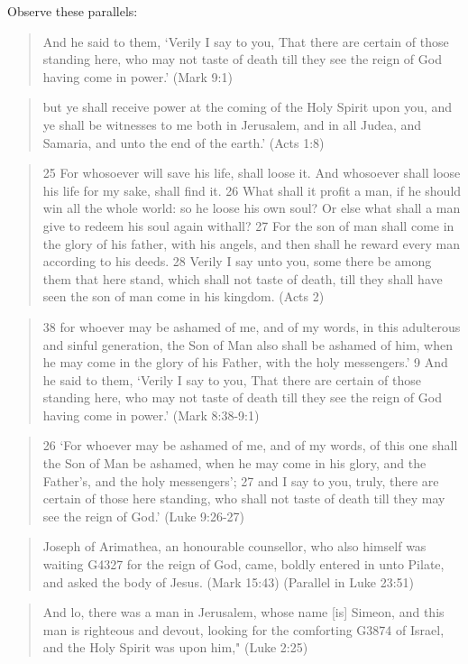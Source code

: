\documentclass[11pt]{article}
\begin{document}
Observe these parallels:
\begin{quote}
And he said to them, ‘Verily I say to you, That there are certain of those standing here, who may not taste of death till they see the reign of God having come in power.’ (Mark 9:1)
\end{quote}
\begin{quote}
but ye shall receive power at the coming of the Holy Spirit upon you, and ye shall be witnesses to me both in Jerusalem, and in all Judea, and Samaria, and unto the end of the earth.' (Acts 1:8)
\end{quote}
\begin{quote}
25 For whosoever will save his life, shall loose it. And whosoever shall loose his life for my sake, shall find it. 26 What shall it profit a man, if he should win all the whole world: so he loose his own soul? Or else what shall a man give to redeem his soul again withall? 27 For the son of man shall come in the glory of his father, with his angels, and then shall he reward every man according to his deeds. 28 Verily I say unto you, some there be among them that here stand, which shall not taste of death, till they shall have seen the son of man come in his kingdom. (Acts 2)
\end{quote}
\begin{quote}
38 for whoever may be ashamed of me, and of my words, in this adulterous and sinful generation, the Son of Man also shall be ashamed of him, when he may come in the glory of his Father, with the holy messengers.'
9 And he said to them, `Verily I say to you, That there are certain of those standing here, who may not taste of death till they see the reign of God having come in power.' (Mark 8:38-9:1)
\end{quote}
\begin{quote}
26 `For whoever may be ashamed of me, and of my words, of this one shall the Son of Man be ashamed, when he may come in his glory, and the Father's, and the holy messengers';
27 and I say to you, truly, there are certain of those here standing, who shall not taste of death till they may see the reign of God.' (Luke 9:26-27) 
\end{quote}
\begin{quote}
Joseph of Arimathea, an honourable counsellor, who also himself was waiting G4327 for the reign of God, came, boldly entered in unto Pilate, and asked the body of Jesus. (Mark 15:43) (Parallel in Luke 23:51)
\end{quote}
\begin{quote}
And lo, there was a man in Jerusalem, whose name [is] Simeon, and this man is righteous and devout, looking for the comforting G3874 of Israel, and the Holy Spirit was upon him," (Luke 2:25)
\end{quote}
\end{document}
